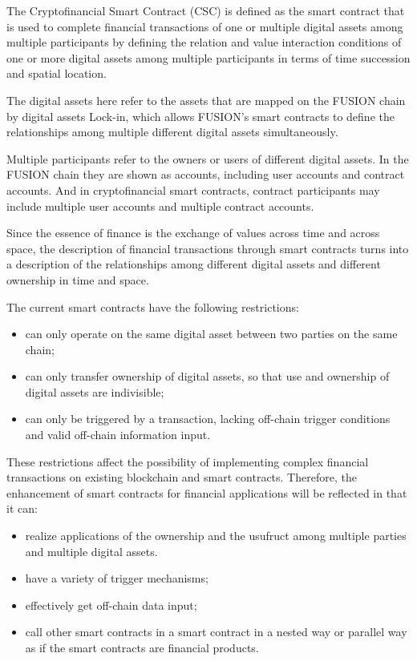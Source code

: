 \documentclass[a4paper,12pt]{article}
\begin{document}
The Cryptofinancial Smart Contract (CSC) is defined as the smart contract that is used to complete financial transactions of one or multiple digital assets among multiple participants by defining the relation and value interaction conditions of one or more digital assets among multiple participants in terms of time succession and spatial location.

The digital assets here refer to the assets that are mapped on the FUSION chain by digital assets Lock-in, which allows FUSION's smart contracts to define the relationships among multiple different digital assets simultaneously.

Multiple participants refer to the owners or users of different digital assets. In the FUSION chain they are shown as accounts, including user accounts and contract accounts. And in cryptofinancial smart contracts, contract participants may include multiple user accounts and multiple contract accounts.

Since the essence of finance is the exchange of values across time and across space, the description of financial transactions through smart contracts turns into a description of the relationships among different digital assets and different ownership in time and space.

The current smart contracts have the following restrictions:

\begin{itemize} [itemindent = 1em]
\item can only operate on the same digital asset between two parties on the same chain;
\item can only transfer ownership of digital assets, so that use and ownership of digital assets are indivisible;
\item can only be triggered by a transaction, lacking off-chain trigger conditions and valid off-chain information input.
\end{itemize}

These restrictions affect the possibility of implementing complex financial transactions on existing blockchain and smart contracts. Therefore, the enhancement of smart contracts for financial applications will be reflected in that it can:

\begin{itemize} [itemindent = 1em]
\item realize applications of the ownership and the usufruct among multiple parties and multiple digital assets.
\item have a variety of trigger mechanisms;
\item effectively get off-chain data input;
\item call other smart contracts in a smart contract in a nested way or parallel way as if the smart contracts are financial products.
\end{itemize}
\end{document}
